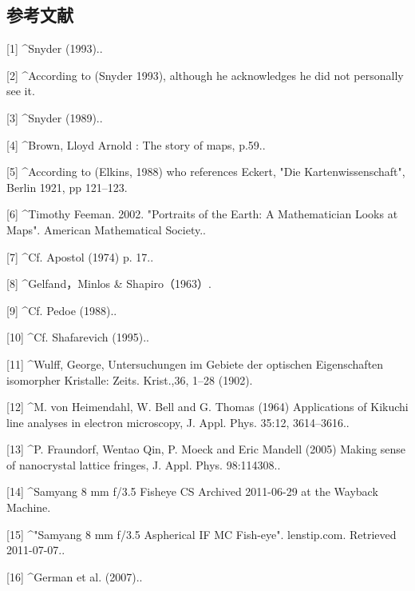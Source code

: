 \subsection{参考文献}
[1]
^Snyder (1993)..

[2]
^According to (Snyder 1993), although he acknowledges he did not personally see it.

[3]
^Snyder (1989)..

[4]
^Brown, Lloyd Arnold : The story of maps, p.59..

[5]
^According to (Elkins, 1988) who references Eckert, "Die Kartenwissenschaft", Berlin 1921, pp 121–123.

[6]
^Timothy Feeman. 2002. "Portraits of the Earth: A Mathematician Looks at Maps". American Mathematical Society..

[7]
^Cf. Apostol (1974) p. 17..

[8]
^Gelfand，Minlos & Shapiro（1963）.

[9]
^Cf. Pedoe (1988)..

[10]
^Cf. Shafarevich (1995)..

[11]
^Wulff, George, Untersuchungen im Gebiete der optischen Eigenschaften isomorpher Kristalle: Zeits. Krist.,36, 1–28 (1902).

[12]
^M. von Heimendahl, W. Bell and G. Thomas (1964) Applications of Kikuchi line analyses in electron microscopy, J. Appl. Phys. 35:12, 3614–3616..

[13]
^P. Fraundorf, Wentao Qin, P. Moeck and Eric Mandell (2005) Making sense of nanocrystal lattice fringes, J. Appl. Phys. 98:114308..

[14]
^Samyang 8 mm f/3.5 Fisheye CS Archived 2011-06-29 at the Wayback Machine.

[15]
^"Samyang 8 mm f/3.5 Aspherical IF MC Fish-eye". lenstip.com. Retrieved 2011-07-07..

[16]
^German et al. (2007)..